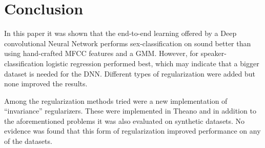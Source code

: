 \section{Conclusion}

In this paper it was shown that the end-to-end learning offered by a Deep convolutional Neural Network performs sex-classification on sound better than using hand-crafted MFCC features and a GMM. However, for speaker-classification logistic regression performed best, which may indicate that a bigger dataset is needed for the DNN. Different types of regularization were added but none improved the results.

Among the regularization methods tried were a new implementation of ``invariance'' regularizers. These were implemented in Theano and in addition to the aforementioned problems it was also evaluated on synthetic datasets. No evidence was found that this form of regularization improved performance on any of the datasets.